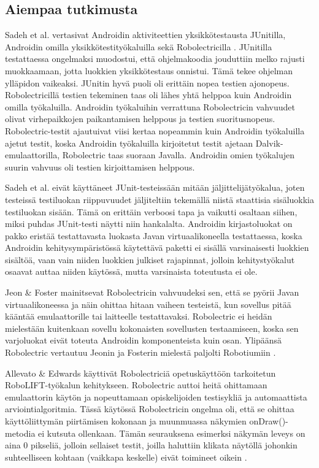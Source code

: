 \subsection{Aiempaa tutkimusta}

Sadeh et al. vertasivat Androidin aktiviteettien yksikkötestausta JUnitilla, Androidin omilla yksikkötestityökaluilla sekä Robolectricilla \cite{sadehetal11}. JUnitilla testattaessa ongelmaksi muodostui, että ohjelmakoodia jouduttiin melko rajusti muokkaamaan, jotta luokkien yksikkötestaus onnistui. Tämä tekee ohjelman ylläpidon vaikeaksi. JUnitin hyvä puoli oli erittäin nopea testien ajonopeus. Robolectricillä testien tekeminen taas oli lähes yhtä helppoa kuin Androidin omilla työkaluilla. Androidin työkaluihin verrattuna Robolectricin vahvuudet olivat virhepaikkojen paikantamisen helppous ja testien suoritusnopeus. Robolectric-testit ajautuivat viisi kertaa nopeammin kuin Androidin työkaluilla ajetut testit, koska Androidin työkaluilla kirjoitetut testit ajetaan Dalvik-emulaattorilla, Robolectric taas suoraan Javalla. Androidin omien työkalujen suurin vahvuus oli testien kirjoittamisen helppous.

Sadeh et al. eivät käyttäneet JUnit-testeissään mitään jäljittelijätyökalua, joten testeissä testiluokan riippuvuudet jäljiteltiin tekemällä niistä staattisia sisäluokkia testiluokan sisään. Tämä on erittäin verboosi tapa ja vaikutti osaltaan siihen, miksi puhdas JUnit-testi näytti niin hankalalta. Androidin kirjastoluokat on pakko eristää testattavasta luokasta Javan virtuaalikoneella testattaessa, koska Androidin kehitysympäristössä käytettävä paketti ei sisällä varsinaisesti luokkien sisältöä, vaan vain niiden luokkien julkiset rajapinnat, jolloin kehitystyökalut osaavat auttaa niiden käytössä, mutta varsinaista toteutusta ei ole.

Jeon \& Foster mainitsevat Robolectricin vahvuudeksi sen, että se pyörii Javan virtuaalikoneessa ja näin ohittaa hitaan vaiheen testeistä, kun sovellus pitää kääntää emulaattorille tai laitteelle testattavaksi. Robolectric ei heidän mielestään kuitenkaan sovellu kokonaisten sovellusten testaamiseen, koska sen varjoluokat eivät toteuta Androidin komponenteista kuin osan. Ylipäänsä Robolectric vertautuu Jeonin ja Fosterin mielestä paljolti Robotiumiin \cite{troyd}.

Allevato \& Edwards käyttivät Robolectriciä opetuskäyttöön tarkoitetun RoboLIFT-työkalun kehitykseen. Robolectric auttoi heitä ohittamaan emulaattorin käytön ja nopeuttamaan opiskelijoiden testisykliä ja automaattista arviointialgoritmia. Tässä käytössä Robolectricin ongelma oli, että se ohittaa käyttöliittymän piirtämisen kokonaan ja muunmuassa näkymien onDraw()-metodia ei kutsuta ollenkaan. Tämän seurauksena esimerksi näkymän leveys on aina 0 pikseliä, jolloin sellaiset testit, joilla haluttiin klikata näytöllä johonkin suhteelliseen kohtaan (vaikkapa keskelle) eivät toimineet oikein \cite{robolift}.

